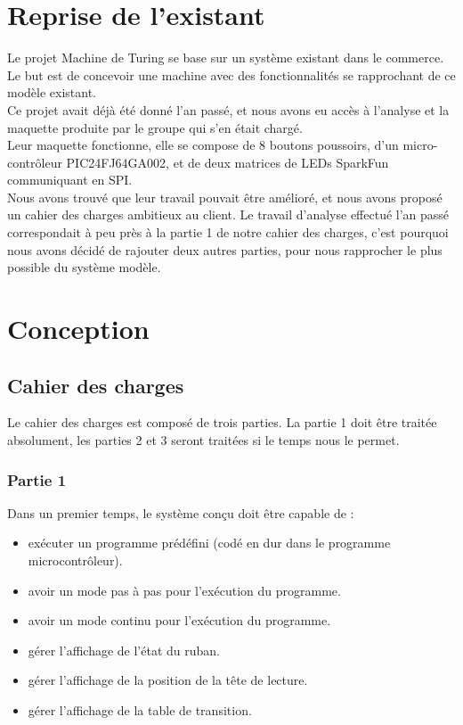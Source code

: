 \documentclass[12pt]{report}
\begin{document}
	 \chapter{Reprise de l'existant}
	 Le projet Machine de Turing se base sur un système existant dans le commerce. Le but est de concevoir une machine avec des fonctionnalités se rapprochant de ce modèle existant.\cite{site_mtu_fr} \\
	 Ce projet avait déjà été donné l'an passé, et nous avons eu accès à l'analyse et la maquette produite par le groupe qui s'en était chargé.\\
	 Leur maquette fonctionne, elle se compose de 8 boutons poussoirs, d'un micro-contrôleur PIC24FJ64GA002, et de deux matrices de LEDs SparkFun communiquant en SPI.\\
	 Nous avons trouvé que leur travail pouvait être amélioré, et nous avons proposé un cahier des charges ambitieux au client. Le travail d'analyse effectué l'an passé correspondait à peu près à la partie 1 de notre cahier des charges, c'est pourquoi nous avons décidé de rajouter deux autres parties, pour nous rapprocher le plus possible du système modèle.
	 \chapter{Conception}
	 \section{Cahier des charges}
	 Le cahier des charges est composé de trois parties. La partie 1 doit être traitée absolument, les parties 2 et 3 seront traitées si le temps nous le permet.
	 \subsection{Partie 1}
	 Dans un premier temps, le système conçu doit être capable de :
	 \begin{itemize}[label=$-$]
	 	\item exécuter un programme prédéfini (codé en dur dans le programme microcontrôleur).
	 	\item avoir un mode pas à pas pour l'exécution du programme.
	 	\item avoir un mode continu pour l'exécution du programme.
	 	\item gérer l'affichage de l'état du ruban.
	 	\item gérer l'affichage de la position de la tête de lecture.
	 	\item gérer l'affichage de la table de transition.
	 \end{itemize}
\end{document}
